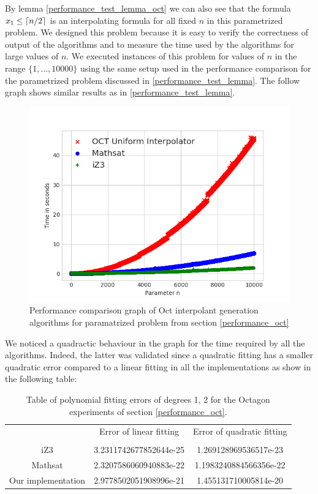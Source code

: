 By lemma \ref{performance_test_lemma_oct}
we can also see that the formula $x_1 \leq \lceil n/2\rceil$ is an 
interpolating formula for all fixed $n$ in this parametrized problem.
We designed this problem because it is easy to verify the 
correctness of output of the algorithms and to measure 
the time used by the algorithms for large values of $n$. 
We executed instances of this problem for values of $n$
in the range $\{1, \dots, 10000\}$ using the same setup 
used in the performance comparison for the parametrized 
problem discussed in \ref{performance_test_lemma}.
The follow graph shows similar results as 
in \ref{performance_test_lemma}.

\begin{figure}
  \centering
  \includegraphics[scale=0.9]{figures/octi_performance_graph}
  \caption{Performance comparison graph of Oct interpolant generation
  algorithms for paramatrized problem from section \ref{performance_oct}} 
  \label{performance_graph_euf}
\end{figure}

We noticed a quadractic behaviour in the graph for the time 
required by all the algorithms. Indeed, the latter was
validated since a quadratic fitting has a smaller quadratic
error compared to a linear fitting in all the implementations
as show in the following table:

\begin{table}[h]
  \centering
  \begin{tabular}{ccc}
    \toprule
    {}                 & Error of linear fitting & Error of quadratic fitting \\
    \cmidrule{2-2} \cmidrule{3-3}                                             \\
    iZ3                & 3.2311742677852644e-25 & 1.269128969536517e-23       \\
    Mathsat            & 2.3207586060940883e-22 & 1.1983240884566356e-22      \\
    Our implementation & 2.9778502051908996e-21 & 1.455131710005814e-20       \\
    \bottomrule
  \end{tabular}
  \caption{Table of polynomial fitting errors of degrees 1, 2 for the
  Octagon experiments of section \ref{performance_oct}.}
\end{table}


